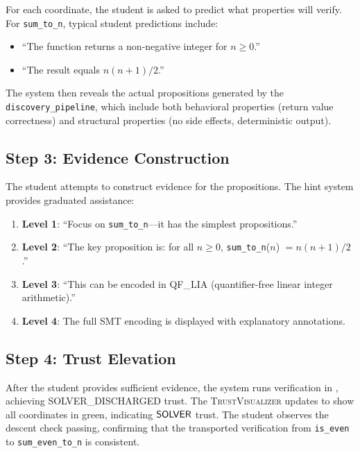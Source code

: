 \documentclass[11pt]{article}
\newcommand{\TrustViz}{\textsc{TrustVisualizer}}
\begin{document}
For each coordinate, the student is asked to predict what properties
\JuGeo{} will verify. For \texttt{sum\_to\_n}, typical student predictions
include:
\begin{itemize}[leftmargin=*]
  \item ``The function returns a non-negative integer for $n \geq 0$.''
  \item ``The result equals $n(n+1)/2$.''
\end{itemize}

The system then reveals the actual \ppLXVIedusimpleloopProps{} propositions
generated by the \texttt{discovery\_pipeline}, which include both behavioral
properties (return value correctness) and structural properties (no side
effects, deterministic output).

\subsection{Step 3: Evidence Construction}

The student attempts to construct evidence for the propositions. The hint
system provides graduated assistance:
\begin{enumerate}
  \item \textbf{Level 1}: ``Focus on \texttt{sum\_to\_n}---it has the
        simplest propositions.''
  \item \textbf{Level 2}: ``The key proposition is: for all $n \geq 0$,
        \texttt{sum\_to\_n}($n$) $= n(n+1)/2$.''
  \item \textbf{Level 3}: ``This can be encoded in QF\_LIA (quantifier-free
        linear integer arithmetic).''
  \item \textbf{Level 4}: The full SMT encoding is displayed with
        explanatory annotations.
\end{enumerate}

\subsection{Step 4: Trust Elevation}

After the student provides sufficient evidence, the system runs
verification in \ppLXVIedusimpleloopTime{}, achieving SOLVER\_DISCHARGED
trust. The \TrustViz{} updates to show all \ppLXVIedusimpleloopCoords{}
coordinates in green, indicating $\mathsf{SOLVER}$ trust. The student observes
the descent check passing, confirming that the transported verification
from \texttt{is\_even} to \texttt{sum\_even\_to\_n} is consistent.
\end{document}
